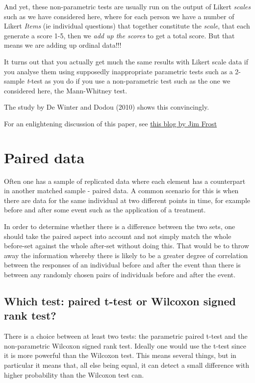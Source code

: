 \documentclass[
  letterpaper,
  DIV=11,
  numbers=noendperiod]{scrreprt}
\begin{document}
And yet, these non-parametric tests are usually run on the output of
Likert \emph{scales} such as we have considered here, where for each
person we have a number of Likert \emph{Items} (ie individual questions)
that together constitute the \emph{scale}, that each generate a score
1-5, then we \emph{add up the scores} to get a total score. But that
means we are adding up ordinal data!!!

It turns out that you actually get much the same results with Likert
scale data if you analyse them using supposedly inappropriate parametric
tests such as a 2-sample \emph{t}-test as you do if you use a
non-parametric test such as the one we considered here, the Mann-Whitney
test.

The study by De Winter and Dodou (2010) shows this convincingly.

For an enlightening discussion of this paper, see
\href{https://statisticsbyjim.com/hypothesis-testing/analyze-likert-scale-data/}{this
blog by Jim Frost}

\section{Paired data}\label{paired-data}

Often one has a sample of replicated data where each element has a
counterpart in another matched sample - paired data. A common scenario
for this is when there are data for the same individual at two different
points in time, for example before and after some event such as the
application of a treatment.

In order to determine whether there is a difference between the two
sets, one should take the paired aspect into account and not simply
match the whole before-set against the whole after-set without doing
this. That would be to throw away the information whereby there is
likely to be a greater degree of correlation between the responses of an
individual before and after the event than there is between any randomly
chosen pairs of individuals before and after the event.

\subsection{Which test: paired t-test or Wilcoxon signed rank
test?}\label{which-test-paired-t-test-or-wilcoxon-signed-rank-test}

There is a choice between at least two tests: the parametric paired
t-test and the non-parametric Wilcoxon signed rank test. Ideally one
would use the t-test since it is more powerful than the Wilcoxon test.
This means several things, but in particular it means that, all else
being equal, it can detect a small difference with higher probability
than the Wilcoxon test can.
\end{document}
